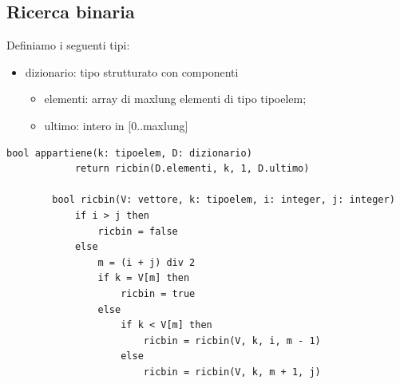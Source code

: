 \documentclass[12pt]{report}
\begin{document}
	\subsection{Ricerca binaria}
	Definiamo i seguenti tipi:
	\begin{itemize}
		\item dizionario: tipo strutturato con componenti
		\begin{itemize}
			\item elementi: array di maxlung elementi di tipo tipoelem;
			\item ultimo: intero in [0..maxlung]
		\end{itemize}
	\end{itemize}
	\begin{lstlisting}[style=pascalstyle]
		bool appartiene(k: tipoelem, D: dizionario)
			return ricbin(D.elementi, k, 1, D.ultimo)

		bool ricbin(V: vettore, k: tipoelem, i: integer, j: integer)
			if i > j then
				ricbin = false
			else
				m = (i + j) div 2
				if k = V[m] then
					ricbin = true
				else
					if k < V[m] then
						ricbin = ricbin(V, k, i, m - 1)
					else
						ricbin = ricbin(V, k, m + 1, j)
	\end{lstlisting}
\end{document}
